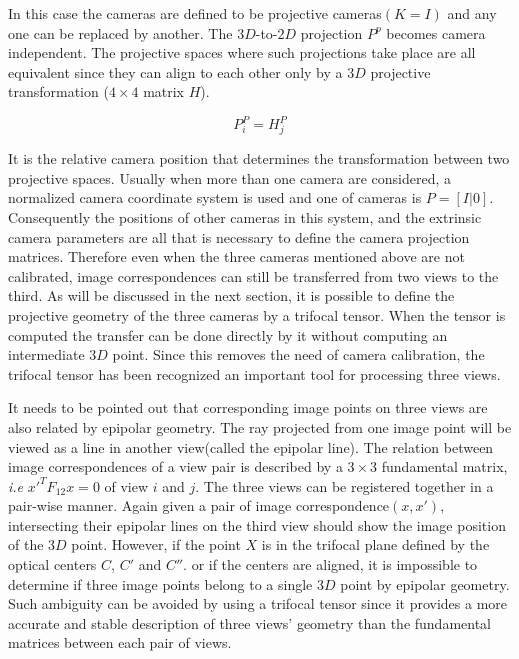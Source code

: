 In this case the cameras are defined to be projective cameras$(K=I)$ and any one can be replaced by another. The $3D$-to-$2D$ projection $P^p$ becomes camera independent. The projective spaces where such projections take place are all equivalent since they can align to each other only by a $3D$ projective transformation
($4 \times4$ matrix $H$)\cite{hartley2003multiple}.

\begin{equation}
	P^P_i = H^P_j
\label{eq_projective_transformation}
\end{equation}

It is the relative camera position that determines the transformation between two projective spaces. Usually when more than one camera are considered, a normalized camera coordinate system is used and one of 
cameras is $P = [I|0]$. Consequently the positions of other cameras in this system, and the extrinsic camera parameters are all that is necessary to define the camera projection matrices. Therefore even when
the three cameras mentioned above are not calibrated, image correspondences can still be transferred from two views to the third. As will be discussed in the next section, it is possible to define the projective geometry of the three cameras by a trifocal tensor. When the tensor is computed the transfer can be done directly by it
without computing an intermediate $3D$ point. Since this removes the need of camera calibration, the trifocal tensor has been recognized an important tool for processing three views.

It needs to be pointed out that corresponding image points on three views are also related by epipolar geometry. The ray projected from one image point will be viewed as a line in another view(called the epipolar line). The relation between image correspondences of a view pair is described by a $3 \times 3$ fundamental matrix, \textit{i.e} $x'^{T}F_{12}x=0$ of view $i$ and $j$. The three views can be registered together in a
pair-wise manner. Again given a pair of image correspondence$(x, x')$, intersecting their epipolar lines on the third view should show the image position of the $3D$ point. However, if the point $X$ is in the trifocal plane defined by the optical centers $C$, $C'$ and $C''$. or if the centers are aligned, it is impossible to determine if three image points belong to a single $3D$ point by epipolar geometry. Such ambiguity can be avoided
by using a trifocal tensor since it provides a more accurate and stable description of three views' geometry than the fundamental matrices between each pair of views.\\

